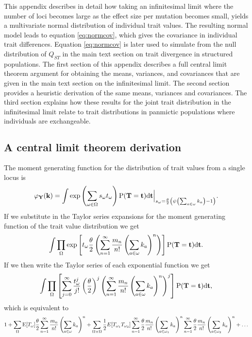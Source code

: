 This appendix describes in detail how taking an infinitesimal limit where the
number of loci becomes large as the effect size per mutation becomes small,
yields a multivariate normal distribution of individual trait values. The
resulting normal model leads to equation \eqref{eq:normcov}, which gives the
covariance in individual trait differences. Equation \eqref{eq:normcov} is later
used to simulate from the null distribution of $Q_{ST}$ in the main text section
on trait divergence in structured populations. The first section of this
appendix describes a full central limit theorem argument for obtaining the
means, variances, and covariances that are given in the main text section on the
infinitesimal limit. The second section provides a heuristic derivation of the
same means, variances and covariances. The third section explains how these
results for the joint trait distribution in the infinitesimal limit relate to
trait distributions in panmictic populations where individuals are exchangeable.

\subsection*{A central limit theorem derivation}
The moment generating function for the distribution of trait values from a
single locus is
\begin{equation*}
  \varphi_{\mathbf{Y}}(\mathbf{k}) = \int \exp \left( \sum_{\omega \in \Omega} s_{\omega}t_{\omega} \right)
  \mathrm{P}(\mathbf{T}=\mathbf{t})\mathrm{d}\mathbf{t}
  \Bigr|_{s_{\omega}=\frac{\theta}{2} \left( \psi\left(\sum_{a \in \omega}k_{a}\right) -1 \right)}.
\end{equation*}
If we substitute in the Taylor series expansions for the moment generating
function of the trait value distribution we get
\begin{equation*}
  \int \prod_{\Omega} \exp\left[ t_{\omega} \frac{\theta}{2} \left( \sum_{n=1}^{\infty} \frac{m_n}{n!}
    \left( \sum_{a \in \omega} k_a \right)^n \right) \right]
  \mathrm{P}(\mathbf{T} = \mathbf{t}) \mathrm{d}\mathbf{t}.
\end{equation*}
If we then write the Taylor series of each exponential function we get
\begin{equation*}
  \int \prod_{\Omega} \left[ \sum_{j=0}^\infty \frac{t_{\omega}^j}{j!}
  \left( \frac{\theta}{2} \right)^j \left( \sum_{n=1}^{\infty} \frac{m_n}{n!}
  \left( \sum_{a \in \omega} k_a \right)^n \right)^j \right]
  \mathrm{P}(\mathbf{T} = \mathbf{t}) \mathrm{d}\mathbf{t},
\end{equation*}
which is equivalent to
\begin{equation*}
  1 + \sum_{\Omega} \mathrm{E}[T_\omega] \frac{\theta}{2} \sum_{n=1}^{\infty} \frac{m_n}{n!} \left(
  \sum_{a \in \omega} k_a \right)^n +
  \sum_{\Omega \times \Omega} \frac{1}{2} E[T_{\omega_1}T_{\omega_2}]
  \sum_{n=1}^{\infty} \frac{\theta}{2} \frac{m_n}{n!} \left(\sum_{a \in \omega_1} k_a \right)^n
  \sum_{n=1}^{\infty} \frac{\theta}{2} \frac{m_n}{n!} \left(\sum_{a \in \omega_2} k_a \right)^n + \ldots
\end{equation*}

